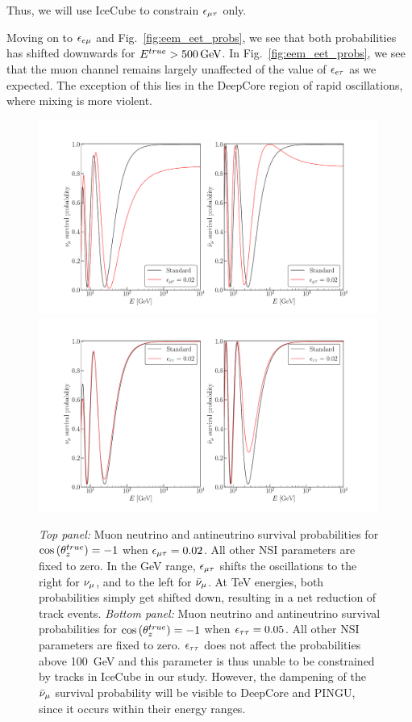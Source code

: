 Thus, we will use IceCube to constrain $\epsilon_{\mu\tau}$ only.


Moving on to $\epsilon_{e\mu}$ and Fig.~\ref{fig:eem_eet_probs}, we see that both probabilities has shifted downwards for $\Etrue > \SI{500}{\GeV}$.
In Fig.~\ref{fig:eem_eet_probs}, we see that the muon channel remains largely unaffected of the value of $\epsilon_{e\tau}$ as we expected. The exception of this lies 
in the DeepCore region of rapid oscillations, where mixing is more violent. 
\begin{figure}
    \begin{center}
        \includegraphics[width=0.99\textwidth]{figures/Pmm_emt_probs.pdf}
        \includegraphics[width=0.99\textwidth]{figures/Pmm_ett_probs.pdf}
        \caption{\emph{Top panel:} Muon neutrino and antineutrino survival probabilities for
        $\cos{(\theta_z^{true})} = -1$ when $\epsilon_{\mu\tau} = 0.02$. All other NSI parameters are fixed to zero. In the \si{\GeV} range, $\epsilon_{\mu\tau}$ shifts the oscillations to the right for $\nu_\mu$, and to the left for $\bar{\nu}_\mu$. At \si{\TeV} energies, both probabilities simply get shifted down, resulting in a net reduction of track events.
        \emph{Bottom panel:} Muon neutrino and antineutrino survival probabilities for
        $\cos{(\theta_z^{true})} = -1$ when $\epsilon_{\tau\tau} = 0.05$. All other NSI parameters are fixed to zero. $\epsilon_{\tau\tau}$ does not affect the probabilities above \SI{100}{\GeV} and this parameter is thus unable to be constrained by tracks in IceCube in our study. However, the dampening of the $\bar{\nu}_\mu$ survival probability will be visible to DeepCore and PINGU, since it occurs within their energy ranges.}
        \label{fig:emt_ett_probs}
    \end{center}
\end{figure}



